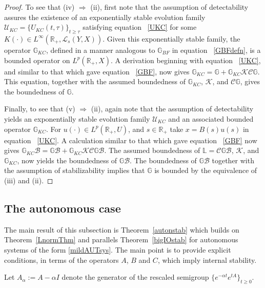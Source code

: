 \documentclass[10pt,psamsfonts,leqno]{siamltex}
\newcommand{\bbR}{\mathbb{R}}
\newcommand{\bbL}{\mathbb{L}}
\newcommand{\bbG}{\mathbb{G}}
\newcommand{\calB}{\mathcal{B}}
\newcommand{\calC}{\mathcal{C}}
\newcommand{\calK}{\mathcal{K}}
\newcommand{\calU}{\mathcal{U}}
\newcommand{\LpRX}{{L^p(\bbR_+,X)}}
\newcommand{\LpRU}{{L^p(\bbR_+,U)}}
\begin{document}
\begin{proof}
To see that (iv) $\Rightarrow$ (ii), first note that the assumption of
detectability assures the existence of an exponentially stable evolution
family $\mathcal{U}_{KC}=\{U_{KC}(t,\tau)\}_{t\ge \tau}$ satisfying
equation ~\eqref{UKC} for some $K(\cdot)\in
L^\infty(\bbR_+,\mathcal{L}_s(Y,X))$. Given this exponentially stable
family, the operator $\bbG_{KC}$, defined in a manner analogous to
$\bbG_{BF}$ in equation ~\eqref{GBFdefn}, is a bounded operator on
$\LpRX$.
A derivation beginning with equation ~\eqref{UKC}, and similar to that
which gave equation ~\eqref{GBF}, now gives $\bbG_{KC}  = \bbG  +
\bbG_{KC}\calK\calC\bbG$.  This equation, together with the assumed
boundedness of $\bbG_{KC}$, $\calK$, and $\calC \bbG$, gives the
boundedness of $\bbG$.

Finally, to see that (v) $\Rightarrow$ (ii), again note that the
assumption
of detectability yields an exponentially stable evolution family
$\calU_{KC}$ and an associated bounded operator $\bbG_{KC}$. For
$u(\cdot)
\in \LpRU$, and $s\in \bbR_+$ take $x = B(s)u(s)$ in equation
~\eqref{UKC}.
A calculation similar to that which gave equation ~\eqref{GBF} now gives
$\bbG_{KC}\calB  = \bbG\calB  + \bbG_{KC}\calK\calC\bbG\calB$.  The
assumed
boundedness of $\bbL=\calC \bbG \calB$, $\calK$, and $\bbG_{KC}$, now
yields the boundedness of $\bbG \calB$.  The boundedness of $\bbG \calB$
together with the assumption of stabilizability implies that $\bbG$ is
bounded by the equivalence of  (iii) and (ii).
\end{proof}

\subsection{The autonomous case}%

The main result of this subsection
is Theorem~\ref{autonstab} which builds on Theorem~\ref{LnormThm}
and parallels Theorem~\ref{bigIOstab}
for autonomous systems of the form \eqref{mildAUTsys}.
The main point is to provide explicit conditions, in terms of the
operators $A$, $B$ and $C$, which imply internal stability.

Let $A_\alpha := A-\alpha I$ denote the
generator of the rescaled semigroup
$\{e^{-\alpha t} e^{tA}\}_{t\ge 0}$.
\end{document}
